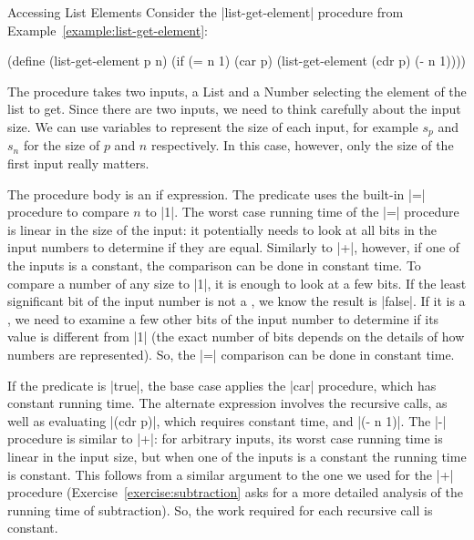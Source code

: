 \begin{schemeregion}
\begin{examplenobar}{Accessing List Elements}\label{example:time-list-get-element}  Consider the \scheme|list-get-element| procedure from Example~\ref{example:list-get-element}:
\begin{schemedisplay}
(define (list-get-element p n) 
   (if (= n 1)
       (car p)
       (list-get-element (cdr p) (- n 1))))
\end{schemedisplay}
The procedure takes two inputs, a List and a Number selecting the element of the list to get.  Since there are two inputs, we need to think carefully about the input size.  We can use variables to represent the size of each input, for example $s_p$ and $s_n$ for the size of $p$ and $n$ respectively.  In this case, however, only the size of the first input really matters.  

The procedure body is an if expression.  The predicate uses the built-in \scheme|=| procedure to compare $n$ to \scheme|1|.  The worst case running time of the \scheme|=| procedure is linear in the size of the input: it potentially needs to look at all bits in the input numbers to determine if they are equal.  Similarly to \scheme|+|, however, if one of the inputs is a constant, the comparison can be done in constant time.  To compare a number of any size to \scheme|1|, it is enough to look at a few bits.  If the least significant bit of the input number is not a , we know the result is \scheme|false|.  If it is a , we need to examine a few other bits of the input number to determine if its value is different from \scheme|1| (the exact number of bits depends on the details of how numbers are represented).  So, the \scheme|=| comparison can be done in constant time.

If the predicate is \schemeresult|true|, the base case applies the \scheme|car| procedure, which has constant running time.  The alternate expression involves the recursive calls, as well as evaluating \scheme|(cdr p)|, which requires constant time, and \scheme|(- n 1)|.  The \scheme|-| procedure is similar to \scheme|+|: for arbitrary inputs, its worst case running time is linear in the input size, but when one of the inputs is a constant the running time is constant.  This follows from a similar argument to the one we used for the \scheme|+| procedure (Exercise~\ref{exercise:subtraction} asks for a more detailed analysis of the running time of subtraction).  So, the work required for each recursive call is constant.


\end{examplenobar}
\end{schemeregion}
